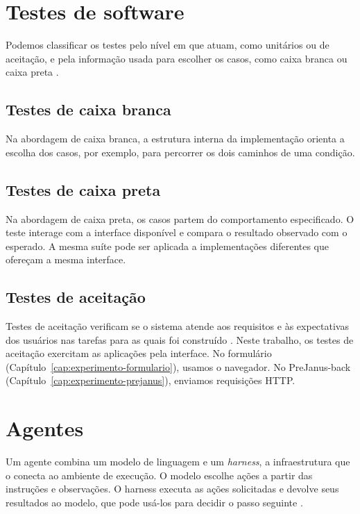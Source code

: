 \documentclass[a4paper,12pt,twoside,english,brazilian]{book}
\begin{document}
\section{Testes de software}
\label{sec:testes-software}

Podemos classificar os testes pelo nível em que atuam, como unitários ou de
aceitação, e pela informação usada para escolher os casos, como caixa branca
ou caixa preta \citep[cap.~5, seções~2.1.1 e~3]{swebok2026}.

\subsection{Testes de caixa branca}
\label{sec:testes-caixa-branca}

Na abordagem de caixa branca, a estrutura interna da implementação orienta
a escolha dos casos, por exemplo, para percorrer os dois caminhos de uma
condição.

\subsection{Testes de caixa preta}
\label{sec:testes-caixa-preta}

Na abordagem de caixa preta, os casos partem do comportamento especificado.
O teste interage com a interface disponível e compara o resultado observado
com o esperado. A mesma suíte pode ser aplicada a implementações diferentes
que ofereçam a mesma interface.

\subsection{Testes de aceitação}
\label{sec:testes-aceitacao}

Testes de aceitação verificam se o sistema atende aos requisitos e às
expectativas dos usuários nas tarefas para as quais foi construído
\citep[cap.~5, seção~2.1.4]{swebok2026}. Neste trabalho, os testes de aceitação
exercitam as aplicações pela interface. No formulário
(Capítulo~\ref{cap:experimento-formulario}), usamos o navegador. No
PreJanus-back (Capítulo~\ref{cap:experimento-prejanus}), enviamos requisições
HTTP.

\section{Agentes}
\label{sec:agentes}

Um agente combina um modelo de linguagem e um \emph{harness}, a infraestrutura
que o conecta ao ambiente de execução. O modelo escolhe ações a partir das
instruções e observações. O harness executa as ações solicitadas e devolve
seus resultados ao modelo, que pode usá-los para decidir o passo seguinte
\citep{trivedy2026harness}.
\end{document}
